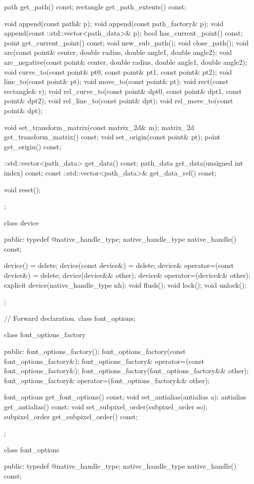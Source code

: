\begin{codeblock}
{{{{{    path get_path() const;
    rectangle get_path_extents() const;

    void append(const path& p);
    void append(const path_factory& p);
    void append(const ::std::vector<path_data>& p);
    bool has_current_point() const;
    point get_current_point() const;
    void new_sub_path();
    void close_path();
    void arc(const point& center, double radius, double angle1, double angle2);
    void arc_negative(const point& center, double radius, double angle1, double 
    angle2);
    void curve_to(const point& pt0, const point& pt1, const point& pt2);
    void line_to(const point& pt);
    void move_to(const point& pt);
    void rect(const rectangle& r);
    void rel_curve_to(const point& dpt0, const point& dpt1, const point& dpt2);
    void rel_line_to(const point& dpt);
    void rel_move_to(const point& dpt);

    void set_transform_matrix(const matrix_2d& m);
    matrix_2d get_transform_matrix() const;
    void set_origin(const point& pt);
    point get_origin() const;

    ::std::vector<path_data> get_data() const;
    path_data get_data(unsigned int index) const;
    const ::std::vector<path_data>& get_data_ref() const;

    void reset();
  };

  class device {
  public:
    typedef @\impdef@ native_handle_type;
    native_handle_type native_handle() const;

    device() = delete;
    device(const device&) = delete;
    device& operator=(const device&) = delete;
    device(device&& other);
    device& operator=(device&& other);
    explicit device(native_handle_type nh);
    void flush();
    void lock();
    void unlock();
  };

  // Forward declaration.
  class font_options;

  class font_options_factory {
  public:
    font_options_factory();
    font_options_factory(const font_options_factory&);
    font_options_factory& operator=(const font_options_factory&);
    font_options_factory(font_options_factory&& other);
    font_options_factory& operator=(font_options_factory&& other);

    font_options get_font_options() const;
    void set_antialias(antialias a);
    antialias get_antialias() const;
    void set_subpixel_order(subpixel_order so);
    subpixel_order get_subpixel_order() const;
  };

  class font_options {
  public:
    typedef @\impdef@ native_handle_type;
    native_handle_type native_handle() const;

}}}}}
\end{codeblock}
